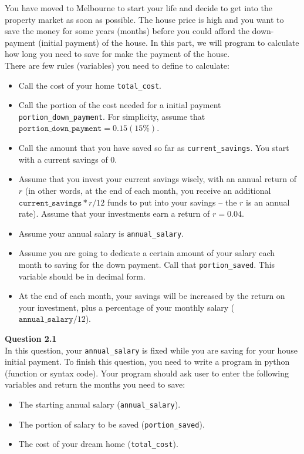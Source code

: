 \documentclass[a4paper]{article}
\begin{document}
    \begin{answer}

   You have moved to Melbourne to start your life and decide to get into the property market as soon as possible. The house price is high and you want to save the money for some years (months) before you could afford the down-payment (initial payment) of the house. In this part, we will program to calculate how long you need to save for make the payment of the house. \\

   There are few rules (variables) you need to define to calculate:
   \begin{itemize}
       \item Call the cost of your home \texttt{total_cost}.
       \item Call the portion of the cost needed for a initial payment \texttt{portion_down_payment}. For simplicity, assume that $\texttt{portion_down_payment} = 0.15 (15\%)$.
       \item Call the amount that you have saved so far as  \texttt{current_savings}. You start with a current savings of $0$.
       \item Assume that you invest your current savings wisely, with an annual return of $r$ (in other words, at the end of each month, you receive an additional $\texttt{current_savings}*r/12$ funds to put into your savings – the $r$ is an annual rate). Assume that your investments earn a return of $r = 0.04$.
       \item Assume your annual salary is \texttt{annual_salary}.
       \item Assume you are going to dedicate a certain amount of your salary each month to saving for the down payment. Call that \texttt{portion_saved}. This variable should be in decimal form.
       \item At the end of each month, your savings will be increased by the return on your investment, plus a percentage of your monthly salary ($\texttt{annual_salary} / 12$).
   \end{itemize}




    \textbf{Question 2.1} \\

    In this question, your \texttt{annual_salary} is fixed while you are saving for your house initial payment.
    To finish this question, you need to write a program in python (function or syntax code). Your program should ask user to enter the following variables and return the months you need to save:
    \begin{itemize}
    \item The starting annual salary (\texttt{annual_salary}).
    \item The portion of salary to be saved (\texttt{portion_saved}).
    \item The cost of your dream home (\texttt{total_cost}).
    \end{itemize}


\end{answer}
\end{document}
